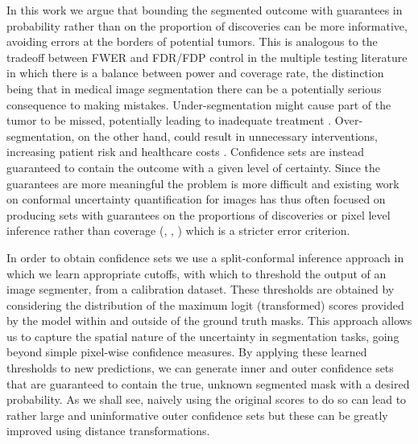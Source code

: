 In this work we argue that bounding the segmented outcome with guarantees in probability rather than on the proportion of discoveries can be more informative, avoiding errors at the borders of potential tumors. This is analogous to the tradeoff between FWER and FDR/FDP control in the multiple testing literature in which there is a balance between power and coverage rate, the distinction being that in medical image segmentation there can be a potentially serious consequence to making mistakes. Under-segmentation might cause part of the tumor to be missed, potentially leading to inadequate treatment \citep{Jalalifar2022}. Over-segmentation, on the other hand, could result in unnecessary interventions, increasing patient risk and healthcare costs \citep{Gupta2020, Patz2014}. Confidence sets are instead guaranteed to contain the outcome with a given level of certainty. Since the guarantees are more meaningful the problem is more difficult and existing work on conformal uncertainty quantification for images has thus often focused on producing sets with guarantees on the proportions of discoveries or pixel level inference rather than coverage (\cite{Bates2021}, \cite{Wieslander2020}, \cite{Mossina2024}) which is a stricter error criterion. 

In order to obtain confidence sets we use a split-conformal inference approach in which we learn appropriate cutoffs, with which to threshold the output of an image segmenter, from a calibration dataset. These thresholds are obtained by considering the distribution of the maximum logit (transformed) scores provided by the model within and outside of the ground truth masks. This approach allows us to capture the spatial nature of the uncertainty in segmentation tasks, going beyond simple pixel-wise confidence measures. By applying these learned thresholds to new predictions, we can generate inner and outer confidence sets that are guaranteed to contain the true, unknown segmented mask with a desired probability. As we shall see, naively using the original scores to do so can lead to rather large and uninformative outer confidence sets but these can be greatly improved using distance transformations. 
 